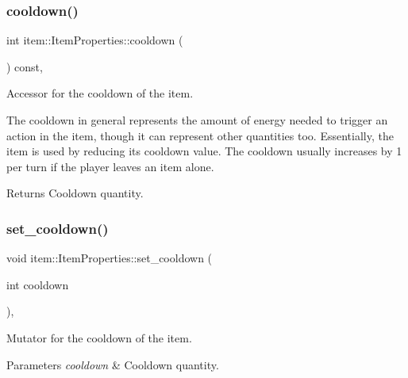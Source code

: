 \subsubsection{\texorpdfstring{cooldown()}{cooldown()}}
{\footnotesize\ttfamily int item\+::\+Item\+Properties\+::cooldown (\begin{DoxyParamCaption}{ }\end{DoxyParamCaption}) const\hspace{0.3cm}{\ttfamily [inline]}, {\ttfamily [noexcept]}}



Accessor for the cooldown of the item. 

The cooldown in general represents the amount of energy needed to trigger an action in the item, though it can represent other quantities too. Essentially, the item is used by reducing its cooldown value. The cooldown usually increases by 1 per turn if the player leaves an item alone. \begin{DoxyReturn}{Returns}
Cooldown quantity. 
\end{DoxyReturn}
\mbox{\label{classitem_1_1_item_properties_aefdce7b5ead1319fff498dc9db102971}} 
\subsubsection{\texorpdfstring{set\+\_\+cooldown()}{set\_cooldown()}}
{\footnotesize\ttfamily void item\+::\+Item\+Properties\+::set\+\_\+cooldown (\begin{DoxyParamCaption}\item[{int}]{cooldown }\end{DoxyParamCaption})\hspace{0.3cm}{\ttfamily [inline]}, {\ttfamily [noexcept]}}



Mutator for the cooldown of the item. 


\begin{DoxyParams}{Parameters}
{\em cooldown} & Cooldown quantity. \\
\hline
\end{DoxyParams}
\mbox{\label{classitem_1_1_item_properties_af81450b28e66fb82ca3f3c4d25143641}} 

